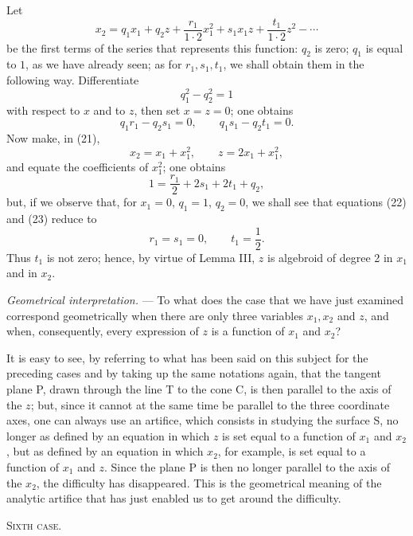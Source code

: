 \documentclass[11pt]{article}
\begin{document}
Let
\begin{equation*}\tag{21}
x_2=q_1x_1+q_2z+\frac{r_1}{1\cdot2}x_1^2+s_1x_1z+\frac{t_1}{1\cdot2}z^2-\cdots
\end{equation*}
be the first terms of the series that represents this function: $q_2$ is zero; $q_1$ is equal to $1$, as we have already seen; as for $r_1,s_1,t_1$, we shall obtain them in the following way. Differentiate
\[
q_1^2-q_2^2=1
\]
with respect to $x$ and to $z$, then set $x=z=0$; one obtains
\begin{equation*}\tag{22}
q_1r_1-q_2s_1=0,\qquad q_1s_1-q_2t_1=0.
\end{equation*}
Now make, in (21),
\[
x_2=x_1+x_1^2,\qquad z=2x_1+x_1^2,
\]
and equate the coefficients of $x_1^2$; one obtains
\begin{equation*}\tag{23}
1=\frac{r_1}{2}+2s_1+2t_1+q_2,
\end{equation*}
but, if we observe that, for $x_1=0$, $q_1=1$, $q_2=0$, we shall see that equations (22) and (23) reduce to
\[
r_1=s_1=0,\qquad t_1=\frac{1}{2}.
\]
Thus $t_1$ is not zero; hence, by virtue of Lemma III, $z$ is algebroid of degree 2 in $x_1$ and in $x_2$.

\emph{Geometrical interpretation.} — To what does the case that we have just examined correspond geometrically when there are only three variables $x_1,x_2$ and $z$, and when, consequently, every expression of $z$ is a function of $x_1$ and $x_2$?

It is easy to see, by referring to what has been said on this subject for the preceding cases and by taking up the same notations again, that the tangent plane P, drawn through the line T to the cone C, is then parallel to the axis of the $z$; but, since it cannot at the same time be parallel to the three coordinate axes, one can always use an artifice, which consists in studying the surface S, no longer as defined by an equation in which $z$ is set equal to a function of $x_1$ and $x_2$, but as defined by an equation in which $x_2$, for example, is set equal to a function of $x_1$ and $z$. Since the plane P is then no longer parallel to the axis of the $x_2$, the difficulty has disappeared. This is the geometrical meaning of the analytic artifice that has just enabled us to get around the difficulty.

\begin{center}
{\scshape Sixth case.}
\end{center}
\end{document}
